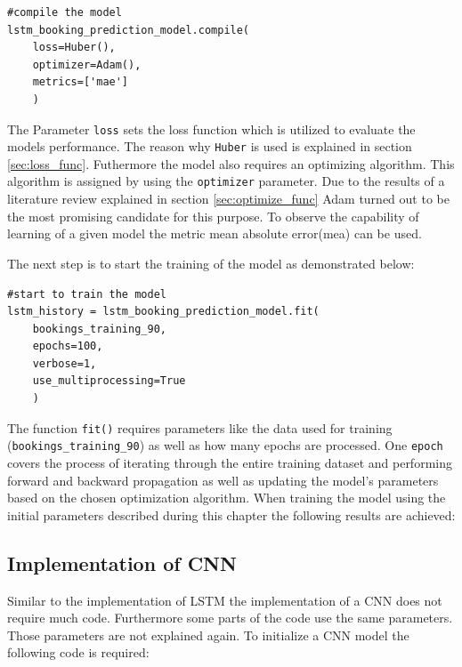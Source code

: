 \begin{lstlisting}
#compile the model 
lstm_booking_prediction_model.compile(
    loss=Huber(),
    optimizer=Adam(),
    metrics=['mae']
	)
\end{lstlisting}
The Parameter \verb|loss| sets the loss function which is utilized to evaluate the models performance. The reason why \verb|Huber| is used is explained in section \ref{sec:loss_func}. Futhermore the model also requires an optimizing algorithm. This algorithm is assigned by using the \verb|optimizer| parameter. Due to the results of a literature review explained in section \ref{sec:optimize_func} Adam turned out to be the most promising candidate for this purpose. To observe the capability of learning of a given model the metric mean absolute error(mea) can be used. 

The next step is to start the training of the model as demonstrated below:
\begin{lstlisting}
#start to train the model
lstm_history = lstm_booking_prediction_model.fit(
    bookings_training_90,
    epochs=100,
    verbose=1,
    use_multiprocessing=True
	)
\end{lstlisting}
The function \verb|fit()| requires parameters like the data used for training (\verb|bookings_training_90|) as well as how many epochs are processed. One \verb|epoch| covers the process of iterating through the entire training dataset and performing forward and backward propagation as well as updating the model's parameters based on the chosen optimization algorithm.
\newline
When training the model using the initial parameters described during this chapter the following results are achieved:



\subsection{Implementation of CNN}
Similar to the implementation of LSTM the implementation of a CNN does not require much code. Furthermore some parts of the code use the same parameters. Those parameters are not explained again. To initialize a CNN model the following code is required: 

